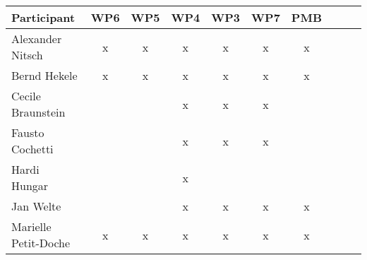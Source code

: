 \documentclass[a4paper, 11pt]{article}
\begin{document}
\begin{tabular}{|l|c|c|c||c|c|c||c|c|c|}
\hline
\textbf{Participant} & \textbf{WP6} &  \textbf{WP5} & \textbf{WP4}&  \textbf{WP3} & \textbf{WP7}&  \textbf{PMB} \\\hline
Alexander Nitsch     & x & x & x & x & x & x \\\hline  
Bernd Hekele         & x & x & x & x & x & x \\\hline
Cecile Braunstein    &   &   & x & x & x &   \\\hline
Fausto Cochetti      &   &   & x & x & x &   \\\hline
Hardi Hungar         &   &   & x &   &   &   \\\hline
Jan Welte            &   &   & x & x & x & x \\\hline
Marielle Petit-Doche & x & x & x & x & x & x \\\hline

\end{tabular}
\end{document}
